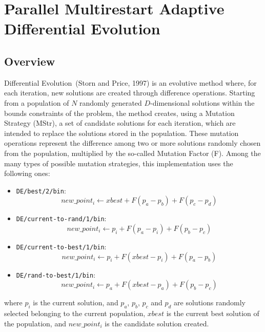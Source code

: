 \documentclass[10pt,twoside]{book}
\begin{document}
\section{Parallel Multirestart Adaptive Differential Evolution}\label{sec:pmade}
\subsection{Overview}\label{subsec:deover}
Differential Evolution~(Storn and Price, 1997) is an evolutive method where, for each iteration, new solutions are created through difference operations.  Starting from a population of $N$ randomly generated $D$-dimensional solutions within the bounds constraints of the problem, the method creates, using a Mutation Strategy (MStr), a set of candidate solutions for each iteration, which are intended to replace the solutions stored in the population. These mutation operations represent the difference among two or more solutions randomly chosen from the population, multiplied by the so-called Mutation Factor (F). Among the many types of possible mutation strategies, this implementation uses the following ones:

\begin{itemize}
	\item \texttt{DE/best/2/bin}: 
	\begin{equation}new\_point_{i} \leftarrow xbest + F ( p_{a} - p_{b} )  + F ( p_{c} - p_{d} )  \end{equation}
	\item \texttt{DE/current-to-rand/1/bin}:
	\begin{equation}new\_point_{i} \leftarrow p_{i} + F ( p_{a} - p_{i} )  + F ( p_{b} - p_{c} )  \end{equation}
	\item \texttt{DE/current-to-best/1/bin}:
	\begin{equation}new\_point_{i} \leftarrow p_{i} + F ( xbest - p_{i} )  + F ( p_{a} - p_{b} )  \end{equation}
	\item \texttt{DE/rand-to-best/1/bin}: 
	\begin{equation}new\_point_{i} \leftarrow p_{a} + F ( xbest - p_{a} )  + F ( p_{b} - p_{c} )  \end{equation}
\end{itemize}  where $p_{i}$ is the current solution, and $p_{a}$, $p_{b}$, $p_{c}$ and $p_{d}$ are solutions randomly selected belonging to the current population, $xbest$ is the current best solution of the population, and $new\_point_{i}$ is the  candidate solution created.  
\end{document}
